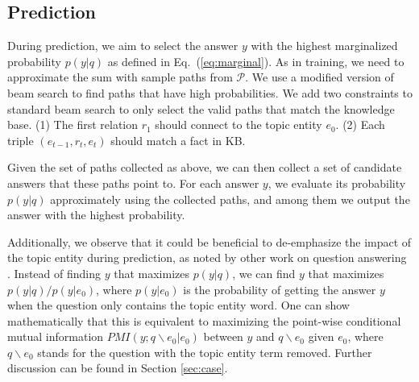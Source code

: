 \subsection{Prediction} \label{sec:pmi}

During prediction, we aim to select the answer $y$ with the highest marginalized probability $p(y|q)$ as defined in Eq.~(\ref{eq:marginal}). As in training, we need to approximate the sum with sample paths from $\mathcal{P}$. We use a modified version of beam search to find paths that have high probabilities. We add two constraints to standard beam search to only select the valid paths that match the knowledge base. (1) The first relation $r_1$ should connect to the topic entity $e_0$. (2) Each triple $(e_{t-1},r_t,e_t)$ should match a fact in KB.

Given the set of paths collected as above, we can then collect a set of candidate answers that these paths point to. For each answer $y$, we evaluate its probability $p(y|q)$
approximately using the collected paths, and among them we output the answer with the highest probability.

Additionally, we observe that it could be beneficial to de-emphasize the impact of the topic entity during prediction, as noted by other work on question answering \cite{DBLP:conf/naacl/LiGBGD16}. Instead of finding $y$ that maximizes $p(y|q)$, we can find $y$ that maximizes $p(y|q)/p(y|e_0)$, where $p(y|e_0)$ is the probability of getting the answer $y$ when the question only contains the topic entity word. One can show mathematically that this is equivalent to maximizing the point-wise conditional mutual information $PMI(y;q\backslash e_0|e_0)$ between $y$ and $q\backslash e_0$ given $e_0$, where $q\backslash e_0$ stands for the question with the topic entity term removed. Further discussion can be found in Section \ref{sec:case}.



